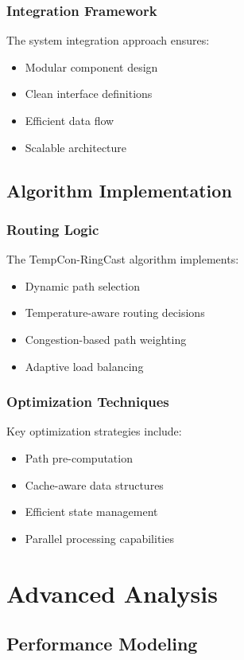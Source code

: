 \documentclass[12pt]{article}
\begin{document}
\subsubsection{Integration Framework}
The system integration approach ensures:
\begin{itemize}[noitemsep]
    \item Modular component design
    \item Clean interface definitions
    \item Efficient data flow
    \item Scalable architecture
\end{itemize}

\subsection{Algorithm Implementation}
\subsubsection{Routing Logic}
The TempCon-RingCast algorithm implements:
\begin{itemize}[noitemsep]
    \item Dynamic path selection
    \item Temperature-aware routing decisions
    \item Congestion-based path weighting
    \item Adaptive load balancing
\end{itemize}

\subsubsection{Optimization Techniques}
Key optimization strategies include:
\begin{itemize}[noitemsep]
    \item Path pre-computation
    \item Cache-aware data structures
    \item Efficient state management
    \item Parallel processing capabilities
\end{itemize}

\section{Advanced Analysis}
\subsection{Performance Modeling}
\end{document}
